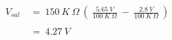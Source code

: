 {\bfseries\itshape{}} 

\begin{flushright}
{\bfseries\itshape{}} \hfill \break
\end{flushright}

\begin{ceqn}
\begin{align*}
V_{sal}\ &=\ 150\ K\ \Omega\ (\ \frac{5.65\ V}{100\ K\ \Omega}\ -\ \frac{2.8\ V}{100\ K\ \Omega}\ ) \\ \\
&=\ 4.27\ V
\end{align*}
\end{ceqn} \hfill \break

\pagebreak